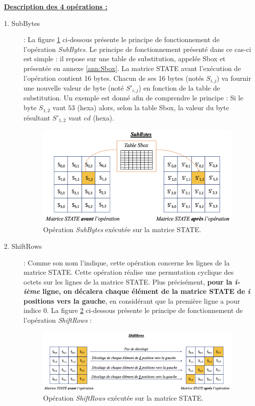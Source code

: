 \documentclass[oneside]{book}
\begin{document}
\newpage
\underline{\textbf{Description des 4 opérations :}} \\
\begin{description}
\item[1. SubBytes]: La figure \ref{fig:SubBytes} ci-dessous présente le principe de fonctionnement de l'opération \textit{SubBytes}. Le principe de fonctionnement présenté dans ce cas-ci est simple : il repose sur une table de substitution, appelée Sbox et présentée en annexe \ref{ann:Sbox}. La matrice STATE avant l'exécution de l'opération contient 16 bytes. Chacun de ses 16 bytes (notés $S_{i,j}$) va fournir une nouvelle valeur de byte (noté $S'_{i,j}$) en fonction de la table de substitution. Un exemple est donné afin de comprendre le principe : Si le byte $S_{1,2}$ vaut $53$ (hexa) alors, selon la table Sbox, la valeur du byte résultant $S'_{1,2}$ vaut $ed$ (hexa).

\begin{figure}[htbp]
    \centering
    \includegraphics[scale=0.58]{image/SubBytes}
    \caption{Opération \textit{SubBytes} exécutée sur la matrice STATE.}
    \label{fig:SubBytes}
\end{figure}
\vspace{1cm}

\item[2. ShiftRows]: Comme son nom l'indique, cette opération concerne les lignes de la matrice STATE. Cette opération réalise une permutation cyclique des octets sur les lignes de la matrice STATE. Plus précisément, \textbf{pour la \textit{i-ième} ligne, on décalera chaque élément de la matrice STATE de \textit{i} positions vers la gauche}, en considérant que la première ligne a pour indice 0.
La figure \ref{fig:ligne} ci-dessous présente le principe de fonctionnement de l'opération \textit{ShiftRows} :
\begin{figure}[htbp]
    \centering
    \includegraphics[scale=0.8]{image/ligne}
    \caption{Opération \textit{ShiftRows} exécutée sur la matrice STATE.}
    \label{fig:ligne}
\end{figure}


\end{description}
\end{document}
